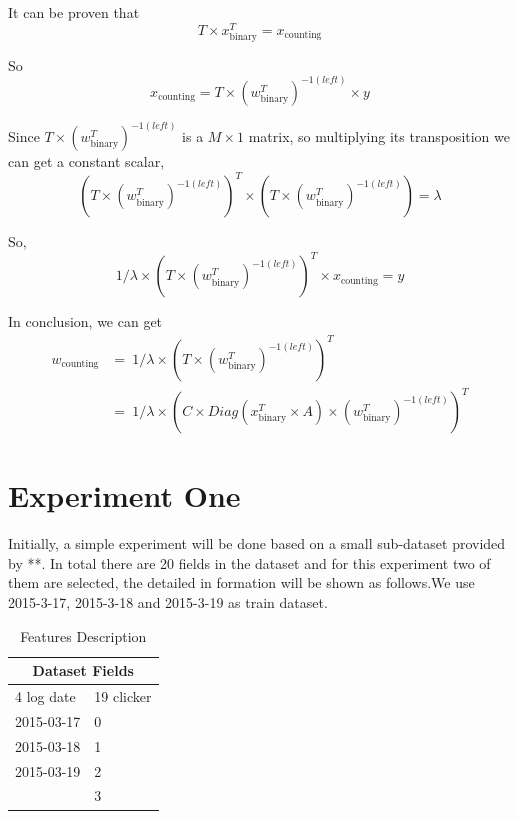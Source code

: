 \documentclass{article}
\begin{document}
It can be proven that 
\begin{equation}
T \times x_{\text{binary}}^T =  x_{\text{counting}}
\end{equation}

So
\begin{equation}
x_{\text{counting}} =  T \times (w_{\text{binary}}^T)^{-1(left)} \times y 
\end{equation}

Since \(T \times (w_{\text{binary}}^T)^{-1(left)}\) is a \(M \times 1\) matrix, so multiplying its transposition we can get a constant scalar, 
\begin{equation}
(T \times (w_{\text{binary}}^T)^{-1(left)})^T \times (T \times (w_{\text{binary}}^T)^{-1(left)}) = \lambda
\end{equation}

So, 
\begin{equation}
1/{\lambda} \times (T \times (w_{\text{binary}}^T)^{-1(left)})^T \times x_{\text{counting}} =  y
\end{equation}

In conclusion, we can get
\begin{equation} 
\begin{split}
w_{\text{counting}} & =\ 1/{\lambda} \times (T \times (w_{\text{binary}}^T)^{-1(left)})^T \\
& = \ 1/{\lambda} \times (C \times Diag(x_{\text{binary}}^T \times A) \times (w_{\text{binary}}^T)^{-1(left)})^T
\end{split}
\end{equation}

\section{Experiment One}

Initially, a simple experiment will be done based on a small sub-dataset provided by **. In total there are 20 fields in the dataset and for this experiment two of them are selected, the detailed in formation will be shown as follows.We use 2015-3-17, 2015-3-18 and 2015-3-19 as train dataset. \vspace{3mm}
\begin{table}[h]
\setlength{\parindent}{17ex}
\begin{tabular}{ |p{3cm}||p{3cm}|  }
 \hline
 \multicolumn{2}{|c|}{Dataset Fields} \\
 \hline
  4 log date  & 19 clicker\\
 \hline
      2015-03-17   &0\\
   2015-03-18  & 1  \\
   2015-03-19 & 2\\
    & 3\\
 \hline
\end{tabular}
\caption{Features Description}
\label{tab:tri}
\end{table}\vspace{3mm}
\end{document}
